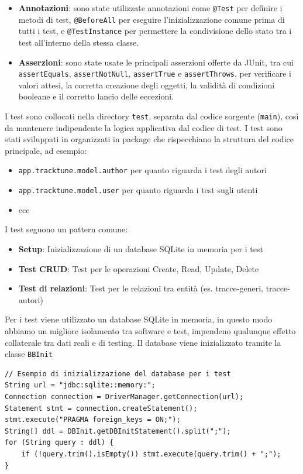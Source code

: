 \documentclass[a4paper]{article}
\begin{document}
\begin{itemize}
    \item \textbf{Annotazioni}: sono state utilizzate annotazioni come \texttt{@Test} per definire i metodi di test, \texttt{@BeforeAll} per eseguire l'inizializzazione comune prima di tutti i test, e \texttt{@TestInstance} per permettere la condivisione dello stato tra i test all'interno della stessa classe.

    \item \textbf{Asserzioni}: sono state usate le principali asserzioni offerte da JUnit, tra cui \texttt{assertEquals}, \texttt{assertNotNull}, \texttt{assertTrue} e \texttt{assertThrows}, per verificare i valori attesi, la corretta creazione degli oggetti, la validità di condizioni booleane e il corretto lancio delle eccezioni.
\end{itemize}

\bigskip

I test sono collocati nella directory \texttt{test}, separata dal codice sorgente (\texttt{main}), così da mantenere indipendente la logica applicativa dal codice di test.
I test sono stati sviluppati in organizzati in package che rispecchiano la struttura del codice principale, ad esempio:
\begin{itemize}
    \item \texttt{app.tracktune.model.author} per quanto riguarda i test degli autori
    \item \texttt{app.tracktune.model.user} per quanto riguarda i test sugli utenti
    \item ecc
\end{itemize}

I test seguono un pattern comune:
\begin{itemize}
    \item \textbf{Setup}: Inizializzazione di un database SQLite in memoria per i test
    \item \textbf{Test CRUD}: Test per le operazioni Create, Read, Update, Delete
    \item \textbf{Test di relazioni}: Test per le relazioni tra entità (es. tracce-generi, tracce-autori)
\end{itemize}

Per i test viene utilizzato un database SQLite in memoria, in questo modo abbiamo un migliore isolamento tra software e test, impendeno qualunque effetto collaterale tra dati reali e di testing. Il database viene inizializzato tramite la classe \texttt{BBInit}

\begin{lstlisting}[style=java-style, caption={Esempio creazione database in memoria}]
// Esempio di inizializzazione del database per i test
String url = "jdbc:sqlite::memory:";
Connection connection = DriverManager.getConnection(url);
Statement stmt = connection.createStatement();
stmt.execute("PRAGMA foreign_keys = ON;");
String[] ddl = DBInit.getDBInitStatement().split(";");
for (String query : ddl) {
    if (!query.trim().isEmpty()) stmt.execute(query.trim() + ";");
}
\end{lstlisting}
\end{document}
